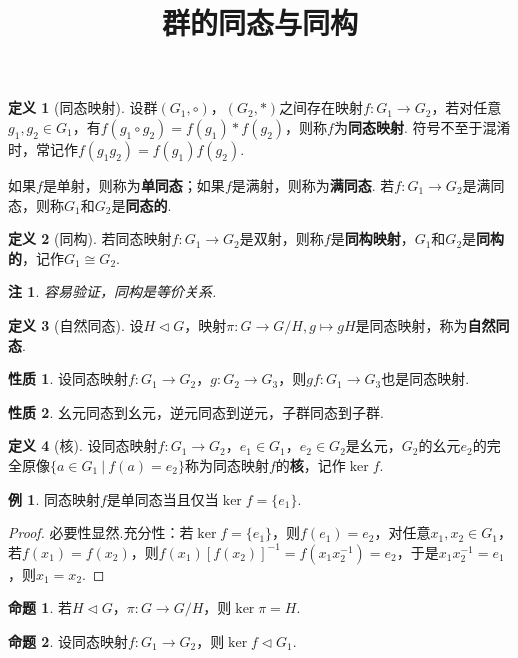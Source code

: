 \documentclass[12pt]{ctexart}
\title{\vspace{-2em}\textbf{群的同态与同构}\vspace{-2em}}
\date{ }
\theoremstyle{definition}
\newtheorem{definition}{定义}
\newtheorem{property}{性质}
\newtheorem{proposition}{命题}
\newtheorem{example}{例}
\theoremstyle{plain}
\newtheorem*{remark}{注}
\begin{document}
	\maketitle
	\begin{definition}[同态映射]
		设群$(G_1,\circ)$，$(G_2,\ast)$之间存在映射$f:G_1\to G_2$，若对任意$g_1,g_2\in G_1$，有$f(g_1\circ g_2)=f(g_1)\ast f(g_2)$，则称$f$为\textbf{同态映射}. 符号不至于混淆时，常记作$f(g_1g_2)=f(g_1)f(g_2)$.
	\end{definition}
	如果$f$是单射，则称为\textbf{单同态}；如果$f$是满射，则称为\textbf{满同态}. 若$f:G_1\to G_2$是满同态，则称$G_1$和$G_2$是\textbf{同态的}.
	\begin{definition}[同构]
		若同态映射$f:G_1\to G_2$是双射，则称$f$是\textbf{同构映射}，$G_1$和$G_2$是\textbf{同构的}，记作$G_1\cong G_2$.
	\end{definition}
	\begin{remark}
		容易验证，同构是等价关系.
	\end{remark}
	\begin{definition}[自然同态]
		设$H\lhd G$，映射$\pi:G\to G/H,g\mapsto gH$是同态映射，称为\textbf{自然同态}.
	\end{definition}
	\begin{property}
		设同态映射$f:G_1\to G_2$，$g:G_2\to G_3$，则$gf:G_1\to G_3$也是同态映射.
	\end{property}
	\begin{property}
		幺元同态到幺元，逆元同态到逆元，子群同态到子群.
	\end{property}
	\begin{definition}[核]
		设同态映射$f:G_1\to G_2$，$e_1\in G_1$，$e_2\in G_2$是幺元，$G_2$的幺元$e_2$的完全原像$\{a\in G_1\ |\ f(a)=e_2\}$称为同态映射$f$的\textbf{核}，记作$\ker f$.
	\end{definition}
	\begin{example}
		同态映射$f$是单同态当且仅当$\ker f=\{e_1\}$.
	\end{example}
	\begin{proof}
		必要性显然.充分性：若$\ker f=\{e_1\}$，则$f(e_1)=e_2$，对任意$x_1,x_2\in G_1$，若$f(x_1)=f(x_2)$，则$f(x_1)\left[f(x_2)\right]^{-1}=f(x_1x_2^{-1})=e_2$，于是$x_1x_2^{-1}=e_1$，则$x_1=x_2$.
	\end{proof}
	\begin{proposition}
		若$H\lhd G$，$\pi:G\to G/H$，则$\ker\pi=H$.
	\end{proposition}
	\begin{proposition}
		设同态映射$f:G_1\to G_2$，则$\ker f\lhd G_1$.
	\end{proposition}
\end{document}
